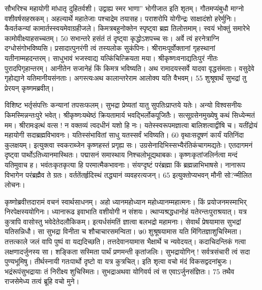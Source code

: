 सौभरिश्च महायोगी मांधातृ दुहितर्वशी।
 उद्वाह्य स्मर भाणा” भोगीजात इति शृतम्।
 गौतमप्यंबुधौ माग्नो वशीवर्षसहस्रकम्।
 अहल्यार्थे महातेजाः पश्चाद्रेम तयासह।
 पराशरोपि योगीन्द्रः साक्षादंशो हरेर्मुनिः।
 कैवर्तकन्यां कामार्तस्स्वयमेवाग्रहीजले।
 किमत्रबहुनोक्तेन स्पृष्ट्वा ब्रह्म तिलोत्तमाम्।
 स्वयं भोक्तुं समारेभे कामोवीक्ष्याहसच्चतम्।
 50 सभान्तरे हसंतं तं दृष्ट्वा कृद्धोऽशपच्च सः।
 अर्वे त्वं हरनेत्राग्नि दग्धोसंगोभविष्यसि।
 प्रसादात्पुनरंगी त्वं तस्यलोक सुकंपिनः।
 श्रीरामःपूर्वोक्तानां गृहस्थानां यतीनाम्महदन्तरम्।
 साधुभावं भजस्वाद्य यत्किंचित्क्रियता मया।
 श्रीकृष्णःवनाद्यतिःपुरं नीतः पुरादपिगृहान्तरम्।
 आनीतेन सजानेहं किं किमत्र भविष्यति।
 अथ रामादयस्सर्वे यादवा वृद्धसंमताः।
 वसुदेवे गृहोद्याने यतिमानीयसंनताः।
 अगस्त्यःअथ कालान्तरेराम आलोक्य यति वैभवम्।
 55 शुश्रूषार्थं सुभद्रां तु प्रेरयन् कृष्णमब्रवीत्।

विशिष्ट भर्तृसंपत्तिः कन्यानां तपसःफलम्।
 सुभद्रा प्रेष्यतां यातु सुपतिःप्राप्तये यतेः।
 अन्यो विश्वसनीयः किमस्मिन्नन्तःपुरे भवेत्।
 श्रीकृष्णःयथेष्ठं क्रियतामार्य भवद्भिर्लोकपूजितैः।
 सत्सूग्रसेनमुख्येषु कथं सिध्येन्मतं मम।
 श्रीरामःइत्थं वत्स ! न वक्तव्यं त्वदधीनं यशो हि नः।
 यतेस्स्वरूपमज्ञात्वा बालिशत्वाद्वीषि च।
 यतींद्रोयं महायोगी सदाब्रह्मविभावनः।
 यतिस्संभावितां साधु यतस्सर्वं भविष्यति।
 60 वृथाःसदूषणं कार्यं यतिनिंदा कुलक्षयम्।
 इत्युक्त्वा स्वकराब्जेन कृष्णहस्तं प्रगृह्य सः।
 उग्रसेनादिभिस्सभ्यैरंतिकंचागमद्यतेः।
 एतदागमनं दृष्ट्वा पार्थोऽतिध्यानमास्थितः।
 पद्मासनं समास्थाय निश्चलोभूद्यथाबकः।
 कृष्णःकृतांजलिर्नत्वा मन्दं यतिमुवाच ह।
 भवंतःकृतकृत्या हि परमात्मैकभावनाः।
 संयग्दृष्टं परंब्रह्मा किं ब्रह्मन्नाभिभाषसे।
 नानारूप विभागेन परंब्रह्मैव ते ग्रतः।
 वर्ततेंतर्हृदिस्थं तद्ध्यानं व्यवहरत्यजन्।
 65 इत्युक्तोप्यभवन् मौनी सो?न्मीलित लोचनः।

कृष्णोब्रवीत्तदारामं वचनं स्वार्थसाधनम्।
 अहो ध्यानमहोध्यान महोध्यानम्महात्मनः।
 किं प्रयोजनमस्माभिर् निरपेक्षस्ययोगिनः।
 ध्यानारूढ इवाभाति वशीयोगी न संशयः।
 त्थाप्यश्रद्धधानोहं यतेरन्तःपुराश्रयात्।
 यत्र कुत्रापि वासोस्तु भवेदेतेदलौकिकम्।
 इत्यर्धसंमतिं ज्ञात्वा बलभद्रो महामनाः।
 सेवार्थं प्रेषयामास सुभद्रां यतिसन्निधौ।
 सा सुभद्रा विनीता च शौचाचारसमन्विता।
 ७0 शुश्रूषयामास यति मिंगितज्ञाशुचिस्मिता।
 तत्तत्काले जलं वापि पुष्पं वा यद्यदिच्छति।
 तत्तदेवानयामास भैक्षार्थे च न्यवेदयत्।
 कदाचिदन्तिकं गत्वा लक्षणादर्जुनस्य सा।
 शङ्किता सस्मिता पार्थं प्रणमन्ती कृतांजलिः।
 सुभद्रायोगिन् ! सर्वत्रसंचारी त्वं सदा पुण्यभूमिषु।
 तीर्थस्नायी गतःपार्थो दृष्टो वा यत्र कुत्रचित्।
 इति शृत्वा वचो मंदं विकसद्वदनांबुजः।
 भद्रंरूपंसुभद्रायाः तं निरीक्ष्य शुचिस्मितः।
 सुभद्राअथवा योगिवर्य त्वं स एवाऽर्जुनसंज्ञितः।
 75 तथैव राजसेमेध्य तत्वं ब्रूहि वचो मुने।

